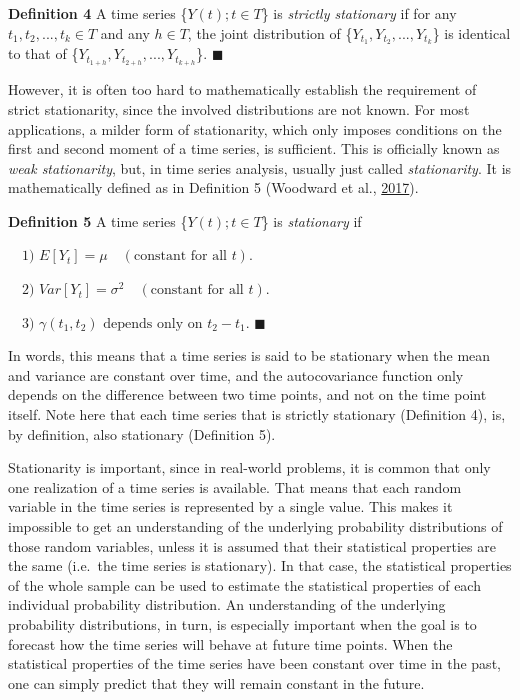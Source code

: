 \documentclass[12pt,oneside]{reedthesis}
\begin{document}
\textbf{Definition 4} A time series \{\(Y(t); t \in T\)\} is
\emph{strictly stationary} if for any \(t_{1}, t_{2}, ..., t_{k} \in T\)
and any \(h \in T\), the joint distribution of
\{\(Y_{t_{1}}, Y_{t_{2}}, ..., Y_{t_{k}}\)\} is identical to that of
\{\(Y_{t_{1+h}}, Y_{t_{2+h}}, ..., Y_{t_{k+h}}\)\}. \(\blacksquare\)

However, it is often too hard to mathematically establish the
requirement of strict stationarity, since the involved distributions are
not known. For most applications, a milder form of stationarity, which
only imposes conditions on the first and second moment of a time series,
is sufficient. This is officially known as \emph{weak stationarity},
but, in time series analysis, usually just called \emph{stationarity}.
It is mathematically defined as in Definition 5 (Woodward et al.,
\protect\hyperlink{ref-woodward2017}{2017}).

\textbf{Definition 5} A time series \{\(Y(t); t \in T\)\} is
\emph{stationary} if

\(\quad \text{1) } E[Y_{t}] = \mu \quad (\text{constant for all }t)\).

\(\quad \text{2) } Var[Y_{t}] = \sigma^{2} \quad (\text{constant for all }t)\).

\(\quad \text{3) } \gamma(t_{1}, t_{2}) \text{ depends only on } t_{2} - t_{1}\).
\(\blacksquare\)

In words, this means that a time series is said to be stationary when
the mean and variance are constant over time, and the autocovariance
function only depends on the difference between two time points, and not
on the time point itself. Note here that each time series that is
strictly stationary (Definition 4), is, by definition, also stationary
(Definition 5).

Stationarity is important, since in real-world problems, it is common
that only one realization of a time series is available. That means that
each random variable in the time series is represented by a single
value. This makes it impossible to get an understanding of the
underlying probability distributions of those random variables, unless
it is assumed that their statistical properties are the same (i.e.~the
time series is stationary). In that case, the statistical properties of
the whole sample can be used to estimate the statistical properties of
each individual probability distribution. An understanding of the
underlying probability distributions, in turn, is especially important
when the goal is to forecast how the time series will behave at future
time points. When the statistical properties of the time series have
been constant over time in the past, one can simply predict that they
will remain constant in the future.
\end{document}
